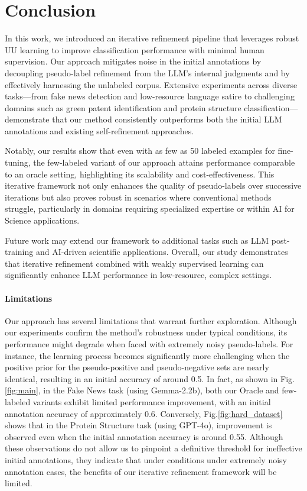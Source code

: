 \section{Conclusion}
In this work, we introduced an iterative refinement pipeline that leverages robust UU learning to improve classification performance with minimal human supervision. Our approach mitigates noise in the initial annotations by decoupling pseudo-label refinement from the LLM’s internal judgments and by effectively harnessing the unlabeled corpus. Extensive experiments across diverse tasks—from fake news detection and low-resource language satire to challenging domains such as green patent identification and protein structure classification—demonstrate that our method consistently outperforms both the initial LLM annotations and existing self-refinement approaches.

Notably, our results show that even with as few as 50 labeled examples for fine-tuning, the few-labeled variant of our approach attains performance comparable to an oracle setting, highlighting its scalability and cost-effectiveness. This iterative framework not only enhances the quality of pseudo-labels over successive iterations but also proves robust in scenarios where conventional methods struggle, particularly in domains requiring specialized expertise or within AI for Science applications.

Future work may extend our framework to additional tasks such as LLM post-training and AI-driven scientific applications. Overall, our study demonstrates that iterative refinement combined with weakly supervised learning can significantly enhance LLM performance in low-resource, complex settings.

\paragraph{Limitations}
Our approach has several limitations that warrant further exploration. Although our experiments confirm the method’s robustness under typical conditions, its performance might degrade when faced with extremely noisy pseudo-labels. For instance, the learning process becomes significantly more challenging when the positive prior for the pseudo-positive and pseudo-negative sets are nearly identical, resulting in an initial accuracy of around 0.5. In fact, as shown in Fig.\ref{fig:main}, in the Fake News task (using Gemma-2.2b), both our Oracle and few-labeled variants exhibit limited performance improvement, with an initial annotation accuracy of approximately 0.6. Conversely, Fig.\ref{fig:hard_dataset} shows that in the Protein Structure task (using GPT-4o), improvement is observed even when the initial annotation accuracy is around 0.55. Although these observations do not allow us to pinpoint a definitive threshold for ineffective initial annotations, they indicate that under conditions under extremely noisy annotation cases, the benefits of our iterative refinement framework will be limited.


